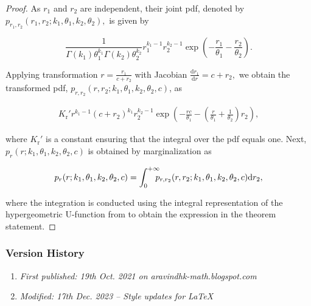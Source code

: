 \begin{proof}
As $r_1$ and $r_2$ are independent, their joint pdf, denoted by $p_{r_1,r_2}(r_1,r_2;k_1,\theta_1,k_2,\theta_2),$ is given by

\begin{equation}\frac{1}{\Gamma(k_1) \theta_1^{k_1} \Gamma(k_2) \theta_2^{k_2}} r_1^{k_1-1} r_2^{k_2-1} \exp\left(-\frac{r_1}{\theta_1}-\frac{r_2}{\theta_2}\right).\end{equation}

Applying transformation $r = \frac{r_1}{c+r_2}$ with Jacobian $\frac{\mathrm{d} r_1}{\mathrm{d} r} = c+r_2,$ we obtain the transformed pdf, $p_{r,r_2}(r,r_2;k_1,\theta_1,k_2,\theta_2,c)$, as

\begin{align}K_\mathrm{r}' r^{k_1-1} (c+r_2)^{k_1} r_2^{k_2-1}\exp\left(-\frac{rc}{\theta_1}-\left(\frac{r}{\theta_1} +\frac{1}{\theta_2}\right)r_2\right),\end{align}

where $K_\mathrm{r}'$ is a constant ensuring that the integral over the pdf equals one. Next, 
$p_r(r;k_1,\theta_1,k_2,\theta_2,c)$ is obtained by marginalization as

\begin{equation}p_r(r;k_1,\theta_1,k_2,\theta_2,c) = \int_{0}^{+\infty} \hspace{-0.25cm} p_{r,r_2}(r,r_2;k_1,\theta_1,k_2,\theta_2,c) \mathrm{d} r_2,\end{equation}

where the integration is conducted using the integral representation of the hypergeometric U-function from \cite[Chapter 13, Kummer function]{Olver2010} to obtain the expression in the theorem statement.
\end{proof}

\subsubsection{Version History}
\begin{enumerate}
	\item \emph{First published: 19th Oct. 2021 on aravindhk-math.blogspot.com}
	\item \emph{Modified: 17th Dec. 2023 -- Style updates for \LaTeX}
\end{enumerate}

